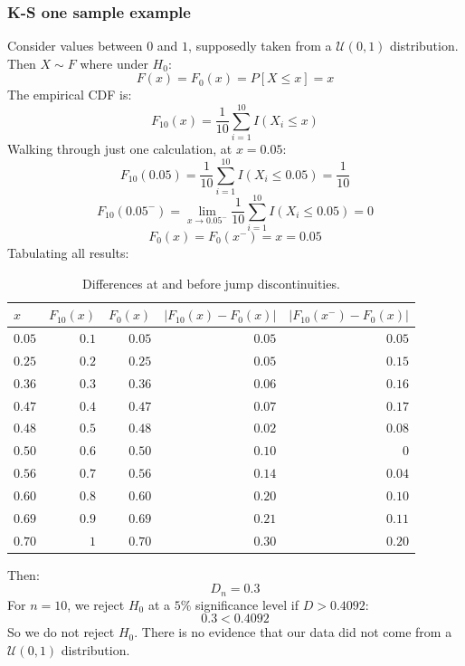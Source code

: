 \documentclass[12pt]{article}
\begin{document}
\subsubsection{K-S one sample example}
Consider values between \(0\) and \(1\), supposedly taken from a \(\mathcal{U}(0,1)\) distribution. Then \(X\sim F\) where under \(H_0\):
\[F(x)=F_0(x)=P[X\leq x]=x\]
The empirical CDF is:
\[F_{10}(x)=\frac{1}{10}\sum^{10}_{i=1}I(X_i\leq x)\]
Walking through just one calculation, at \(x=0.05\):
\[F_{10}(0.05)=\frac{1}{10}\sum^{10}_{i=1}I(X_i\leq 0.05)=\frac{1}{10}\]
\[F_{10}(0.05^-)=\lim_{x\to 0.05^-}\frac{1}{10}\sum^{10}_{i=1}I(X_i\leq 0.05)=0\]
\[F_0(x)=F_0(x^-)=x=0.05\]
Tabulating all results:
\begin{table}[H]
    \centering
    \begin{tabular}{l|rrrr}
        \(x\) & \(F_{10}(x)\) & \(F_0(x)\) & \(|F_{10}(x)-F_0(x)|\) & \(|F_{10}(x^-)-F_0(x)|\)  \\ \hline
        \(0.05\) & \(0.1\) & \(0.05\) & \(0.05\) & \(0.05\) \\
        \(0.25\) & \(0.2\) & \(0.25\) & \(0.05\) & \(0.15\) \\
        \(0.36\) & \(0.3\) & \(0.36\) & \(0.06\) & \(0.16\) \\
        \(0.47\) & \(0.4\) & \(0.47\) & \(0.07\) & \(0.17\) \\
        \(0.48\) & \(0.5\) & \(0.48\) & \(0.02\) & \(0.08\) \\
        \(0.50\) & \(0.6\) & \(0.50\) & \(0.10\) & \(0\) \\
        \(0.56\) & \(0.7\) & \(0.56\) & \(0.14\) & \(0.04\) \\
        \(0.60\) & \(0.8\) & \(0.60\) & \(0.20\) & \(0.10\) \\
        \(0.69\) & \(0.9\) & \(0.69\) & \(0.21\) & \(0.11\) \\
        \(0.70\) & \(1\) & \(0.70\) & \(0.30\) & \(0.20\) \\
    \end{tabular}
    \caption{Differences at and before jump discontinuities.}
\end{table}
Then:
\[D_n=0.3\]
For \(n=10\), we reject \(H_0\) at a \(5\%\) significance level if \(D>0.4092\):
\[0.3<0.4092\]
So we do not reject \(H_0\). There is no evidence that our data did not come from a \(\mathcal{U}(0,1)\) distribution.
\end{document}
